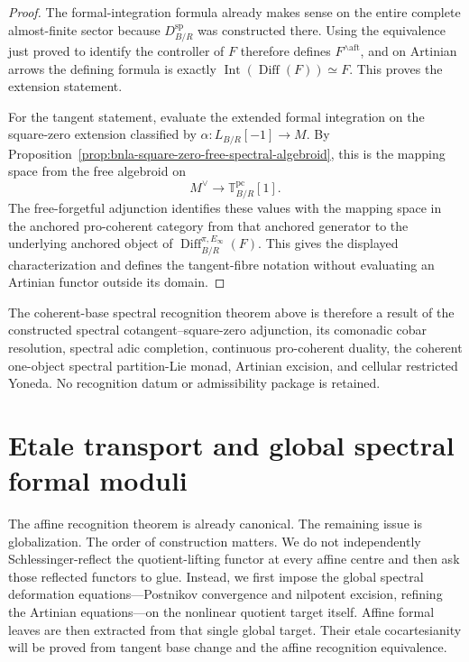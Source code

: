 \begin{proof}
The formal-integration formula already makes sense on the entire complete
almost-finite sector because $D^{\mathrm{sp}}_{B/R}$ was constructed there.
Using the equivalence just proved to identify the controller of $F$ therefore
defines $F^{\wedge\mathrm{aft}}$, and on Artinian arrows the defining formula
is exactly $\operatorname{Int}(\operatorname{Diff}(F))\simeq F$.  This proves
the extension statement.

For the tangent statement, evaluate the extended formal integration on the
square-zero extension classified by
$\alpha:L_{B/R}[-1]\to M$.  By
Proposition~\ref{prop:bnla-square-zero-free-spectral-algebroid}, this is the
mapping space from the free algebroid on
\[
    M^\vee\longrightarrow\mathbb T^{\mathrm{pc}}_{B/R}[1].
\]
The free-forgetful adjunction identifies these values with the mapping space
in the anchored pro-coherent category from that anchored generator to the
underlying anchored object of
$\operatorname{Diff}^{\pi,E_\infty}_{B/R}(F)$.  This gives the displayed
characterization and defines the tangent-fibre notation without evaluating an
Artinian functor outside its domain.
\end{proof}

The coherent-base spectral recognition theorem above is therefore a result of
the constructed spectral cotangent--square-zero adjunction, its comonadic
cobar resolution, spectral adic completion, continuous pro-coherent duality,
the coherent one-object spectral partition-Lie monad, Artinian excision, and
cellular restricted Yoneda.  No recognition datum or admissibility package is
retained.
\section{Etale transport and global spectral formal moduli}
\label{sec:bnla-spectral-global-formal-moduli}

The affine recognition theorem is already canonical.  The remaining issue is
globalization.  The order of construction matters.  We do not independently
Schlessinger-reflect the quotient-lifting functor at every affine centre and
then ask those reflected functors to glue.  Instead, we first impose the
global spectral deformation equations---Postnikov convergence and nilpotent
excision, refining the Artinian equations---on the nonlinear quotient target
itself.  Affine formal leaves are then extracted from that single global target.  Their
etale cocartesianity will be proved from tangent base change and the affine
recognition equivalence.

